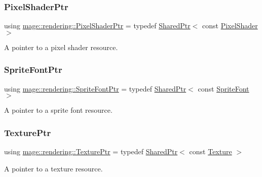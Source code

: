 \subsubsection{\texorpdfstring{Pixel\+Shader\+Ptr}{PixelShaderPtr}}
{\footnotesize\ttfamily using \mbox{\hyperlink{namespacemage_1_1rendering_af03d922b228ee9c8542baaa2ecc9f259}{mage\+::rendering\+::\+Pixel\+Shader\+Ptr}} = typedef \mbox{\hyperlink{namespacemage_a1e01ae66713838a7a67d30e44c67703e}{Shared\+Ptr}}$<$ const \mbox{\hyperlink{namespacemage_1_1rendering_a19905114913398d5073148f6c416e1b7}{Pixel\+Shader}} $>$}

A pointer to a pixel shader resource. \mbox{\label{namespacemage_1_1rendering_ab2f34196c20422ca3692ad3f3bff3a5d}} 
\subsubsection{\texorpdfstring{Sprite\+Font\+Ptr}{SpriteFontPtr}}
{\footnotesize\ttfamily using \mbox{\hyperlink{namespacemage_1_1rendering_ab2f34196c20422ca3692ad3f3bff3a5d}{mage\+::rendering\+::\+Sprite\+Font\+Ptr}} = typedef \mbox{\hyperlink{namespacemage_a1e01ae66713838a7a67d30e44c67703e}{Shared\+Ptr}}$<$ const \mbox{\hyperlink{classmage_1_1rendering_1_1_sprite_font}{Sprite\+Font}} $>$}

A pointer to a sprite font resource. \mbox{\label{namespacemage_1_1rendering_a6f3ae54f825328465b0cdde0f0de4a36}} 
\subsubsection{\texorpdfstring{Texture\+Ptr}{TexturePtr}}
{\footnotesize\ttfamily using \mbox{\hyperlink{namespacemage_1_1rendering_a6f3ae54f825328465b0cdde0f0de4a36}{mage\+::rendering\+::\+Texture\+Ptr}} = typedef \mbox{\hyperlink{namespacemage_a1e01ae66713838a7a67d30e44c67703e}{Shared\+Ptr}}$<$ const \mbox{\hyperlink{classmage_1_1rendering_1_1_texture}{Texture}} $>$}

A pointer to a texture resource. \mbox{\label{namespacemage_1_1rendering_aaf704b9c54a4181f4950a1761de69dda}} 
